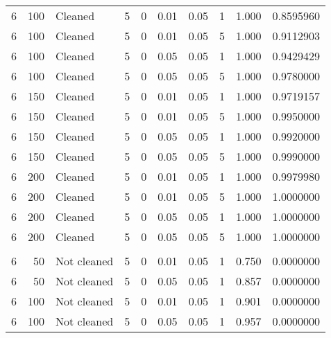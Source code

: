 \begin{table}
{{\begin{tabular}{rrlrrrrrrr}
\hspace{1em}6 & 100 & Cleaned & 5 & 0 & 0.01 & 0.05 & 1 & 1.000 & 0.8595960\\
\hspace{1em}6 & 100 & Cleaned & 5 & 0 & 0.01 & 0.05 & 5 & 1.000 & 0.9112903\\
\hspace{1em}6 & 100 & Cleaned & 5 & 0 & 0.05 & 0.05 & 1 & 1.000 & 0.9429429\\
\hspace{1em}6 & 100 & Cleaned & 5 & 0 & 0.05 & 0.05 & 5 & 1.000 & 0.9780000\\
\hspace{1em}6 & 150 & Cleaned & 5 & 0 & 0.01 & 0.05 & 1 & 1.000 & 0.9719157\\
\hspace{1em}6 & 150 & Cleaned & 5 & 0 & 0.01 & 0.05 & 5 & 1.000 & 0.9950000\\
\hspace{1em}6 & 150 & Cleaned & 5 & 0 & 0.05 & 0.05 & 1 & 1.000 & 0.9920000\\
\hspace{1em}6 & 150 & Cleaned & 5 & 0 & 0.05 & 0.05 & 5 & 1.000 & 0.9990000\\
\hspace{1em}6 & 200 & Cleaned & 5 & 0 & 0.01 & 0.05 & 1 & 1.000 & 0.9979980\\
\hspace{1em}6 & 200 & Cleaned & 5 & 0 & 0.01 & 0.05 & 5 & 1.000 & 1.0000000\\
\hspace{1em}6 & 200 & Cleaned & 5 & 0 & 0.05 & 0.05 & 1 & 1.000 & 1.0000000\\
\hspace{1em}6 & 200 & Cleaned & 5 & 0 & 0.05 & 0.05 & 5 & 1.000 & 1.0000000\\
\addlinespace[0.3em]
\multicolumn{10}{l}{\textbf{$t_3$ Distribution}}\\
\hspace{1em}6 & 50 & Not cleaned & 5 & 0 & 0.01 & 0.05 & 1 & 0.750 & 0.0000000\\
\hspace{1em}6 & 50 & Not cleaned & 5 & 0 & 0.05 & 0.05 & 1 & 0.857 & 0.0000000\\
\hspace{1em}6 & 100 & Not cleaned & 5 & 0 & 0.01 & 0.05 & 1 & 0.901 & 0.0000000\\
\hspace{1em}6 & 100 & Not cleaned & 5 & 0 & 0.05 & 0.05 & 1 & 0.957 & 0.0000000\\

\end{tabular}}}
\end{table}
